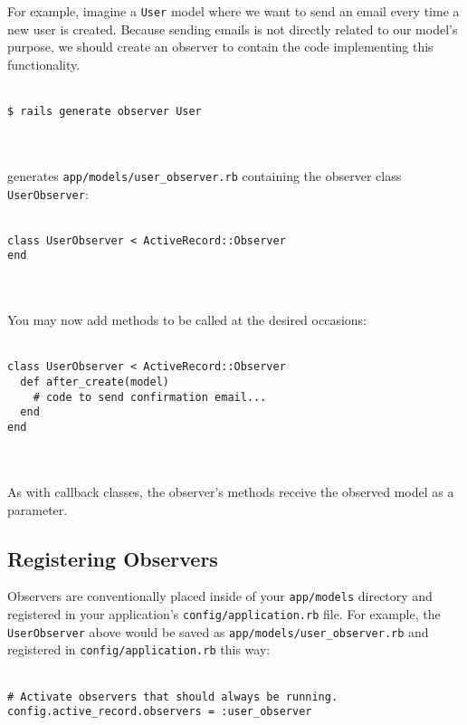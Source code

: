 \documentclass[10pt]{book}
\begin{document}
For example, imagine a \texttt{User} model where we want to send an  email every time a new user is created. Because sending emails is not  directly related to our model’s purpose, we should create an observer to  contain the code implementing this functionality.
\\ \\
\begin{minipage}{\textwidth}{\scriptsize
\begin{verbatim}
$ rails generate observer User
\end{verbatim}}
\end{minipage}
\\ \\

generates \texttt{app/models/user\_observer.rb} containing the observer class \texttt{UserObserver}:
\\ \\
\begin{minipage}{\textwidth}{\scriptsize
\begin{verbatim}
class UserObserver < ActiveRecord::Observer
end
\end{verbatim}}
\end{minipage}
\\ \\

You may now add methods to be called at the desired occasions:
\\ \\
\begin{minipage}{\textwidth}{\scriptsize
\begin{verbatim}
class UserObserver < ActiveRecord::Observer
  def after_create(model)
    # code to send confirmation email...
  end
end
\end{verbatim}}
\end{minipage}
\\ \\

As with callback classes, the observer’s methods receive the observed model as a parameter.

\subsection{ Registering Observers}

Observers are conventionally placed inside of your \texttt{app/models} directory and registered in your application’s \texttt{config/application.rb} file. For example, the \texttt{UserObserver} above would be saved as \texttt{app/models/user\_observer.rb} and registered in \texttt{config/application.rb} this way:
\\ \\
\begin{minipage}{\textwidth}{\scriptsize
\begin{verbatim}
# Activate observers that should always be running.
config.active_record.observers = :user_observer
\end{verbatim}}
\end{minipage}
\\ \\
\end{document}
